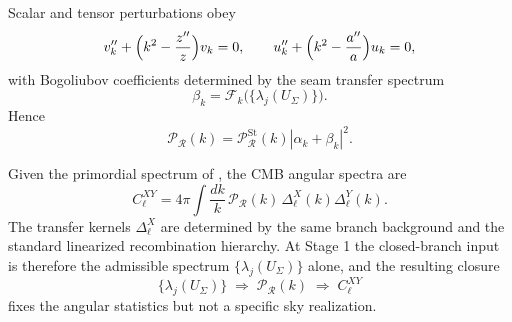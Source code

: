 \begin{conjecture}
\label{thm:primordial_mode_closure_seam_state}
Scalar and tensor perturbations obey
\[
v_k''+\Bigl(k^2-\frac{z''}{z}\Bigr)v_k=0,
\qquad
u_k''+\Bigl(k^2-\frac{a''}{a}\Bigr)u_k=0,
\]
with Bogoliubov coefficients determined by the seam transfer spectrum
\[
\beta_k=\mathcal F_k\bigl(\{\lambda_j(U_\Sigma)\}\bigr).
\]
Hence
\[
\mathcal P_{\mathcal R}(k)=\mathcal P_{\mathcal R}^{\mathrm{St}}(k)|\alpha_k+\beta_k|^2.
\]
\end{conjecture}

\begin{conjecture}
\label{thm:cmb_transfer_closure_closed_branch}
Given the primordial spectrum of
, the CMB angular spectra are
\[
C_\ell^{XY}=4\pi\int \frac{dk}{k}\,\mathcal P_{\mathcal R}(k)\,\Delta_\ell^X(k)\Delta_\ell^Y(k).
\]
The transfer kernels \(\Delta_\ell^X\) are determined by the same branch background and the
standard linearized recombination hierarchy. At Stage 1 the closed-branch input is therefore the
admissible spectrum $\{\lambda_j(U_\Sigma)\}$ alone, and the resulting closure
\[
\{\lambda_j(U_\Sigma)\}\;\Longrightarrow\;\mathcal P_{\mathcal R}(k)\;\Longrightarrow\;C_\ell^{XY}
\]
fixes the angular statistics but not a specific sky realization.
\end{conjecture}

